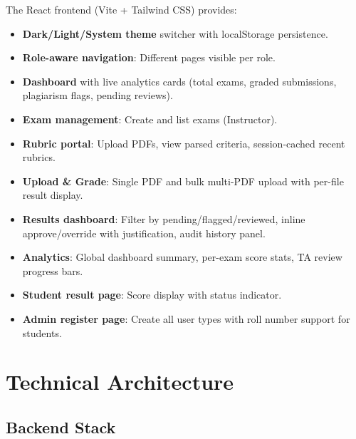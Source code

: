 \documentclass[12pt,a4paper]{article}
\begin{document}
The React frontend (Vite + Tailwind CSS) provides:
\begin{itemize}[noitemsep]
  \item \textbf{Dark/Light/System theme} switcher with localStorage persistence.
  \item \textbf{Role-aware navigation}: Different pages visible per role.
  \item \textbf{Dashboard} with live analytics cards (total exams, graded submissions, plagiarism flags, pending reviews).
  \item \textbf{Exam management}: Create and list exams (Instructor).
  \item \textbf{Rubric portal}: Upload PDFs, view parsed criteria, session-cached recent rubrics.
  \item \textbf{Upload \& Grade}: Single PDF and bulk multi-PDF upload with per-file result display.
  \item \textbf{Results dashboard}: Filter by pending/flagged/reviewed, inline approve/override with justification, audit history panel.
  \item \textbf{Analytics}: Global dashboard summary, per-exam score stats, TA review progress bars.
  \item \textbf{Student result page}: Score display with status indicator.
  \item \textbf{Admin register page}: Create all user types with roll number support for students.
\end{itemize}

\section{Technical Architecture}

\subsection{Backend Stack}
\end{document}

